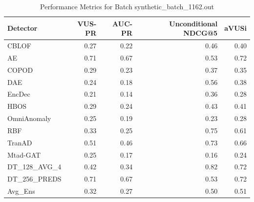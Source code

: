\begin{table}
\centering
\caption{Performance Metrics for Batch synthetic_batch_1162.out}
\label{tab:example_metrics}
\begin{tabular}{lrrrr}
\toprule
    Detector &  VUS-PR &  AUC-PR &  Unconditional NDCG@5 &  aVUSi \\
\midrule
       CBLOF &    0.27 &    0.22 &                  0.46 &   0.40 \\
          AE &    0.71 &    0.67 &                  0.53 &   0.72 \\
       COPOD &    0.29 &    0.23 &                  0.37 &   0.35 \\
         DAE &    0.24 &    0.18 &                  0.56 &   0.38 \\
      EncDec &    0.21 &    0.14 &                  0.36 &   0.28 \\
        HBOS &    0.29 &    0.24 &                  0.43 &   0.41 \\
 OmniAnomaly &    0.25 &    0.19 &                  0.23 &   0.28 \\
         RBF &    0.33 &    0.25 &                  0.75 &   0.61 \\
      TranAD &    0.51 &    0.46 &                  0.73 &   0.66 \\
    Mtad-GAT &    0.25 &    0.17 &                  0.16 &   0.24 \\
DT\_128\_AVG\_4 &    0.42 &    0.34 &                  0.82 &   0.72 \\
DT\_256\_PREDS &    0.71 &    0.67 &                  0.53 &   0.72 \\
     Avg\_Ens &    0.32 &    0.27 &                  0.50 &   0.51 \\
\bottomrule
\end{tabular}
\end{table}
